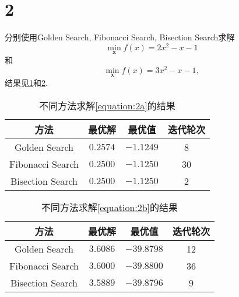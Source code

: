 \section*{2}

分别使用Golden Search, Fibonacci Search, Bisection Search求解
\begin{equation}
    \min_{\bm{x}} f(x)=2x^2-x-1
    \label{equation:2a}
\end{equation}
和
\begin{equation}
    \min_{\bm{x}} f(x)=3x^2-x-1,
    \label{equation:2b}
\end{equation}
结果见\cref{table:2a}和\cref{table:2b}.

\begin{table}[ht]
    \centering
    \caption{不同方法求解\cref{equation:2a}的结果}
    \label{table:2a}
    \begin{tabular}{cccc}
        \toprule
        方法 & 最优解 & 最优值 & 迭代轮次 \\
        \midrule
        Golden Search & $0.2574$ & $-1.1249$ & 8 \\
        Fibonacci Search & $0.2500$ & $-1.1250$ & 30 \\
        Bisection Search & $0.2500$ & $-1.1250$ & 2 \\
        \bottomrule
    \end{tabular}
\end{table}


\begin{table}[ht]
    \centering
    \caption{不同方法求解\cref{equation:2b}的结果}
    \label{table:2b}
    \begin{tabular}{cccc}
        \toprule
        方法 & 最优解 & 最优值 & 迭代轮次 \\
        \midrule
        Golden Search & $3.6086$ & $-39.8798$ & 12 \\
        Fibonacci Search & $3.6000$ & $-39.8800$ & 36 \\
        Bisection Search & $3.5889$ & $-39.8796$ & 9 \\
        \bottomrule
    \end{tabular}
\end{table}
